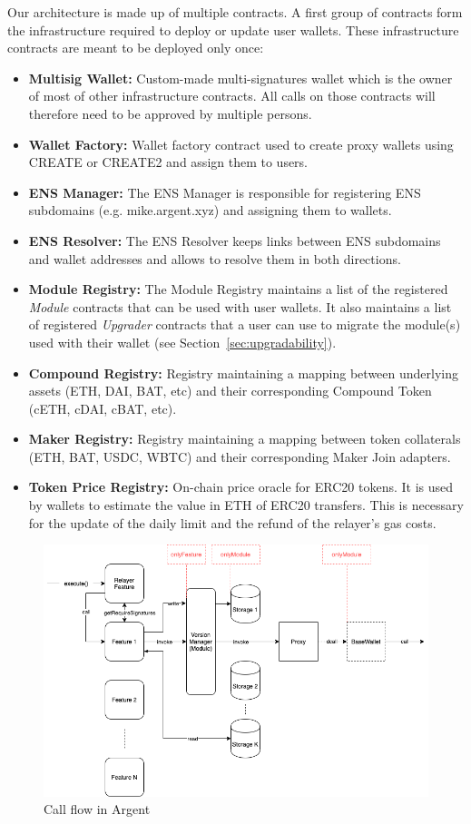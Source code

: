 \documentclass[12pt]{article}
\begin{document}
Our architecture is made up of multiple contracts. A first group of contracts form the infrastructure required to deploy or update user wallets. These infrastructure contracts are meant to be deployed only once:
\begin{itemize}
    \item \textbf{Multisig Wallet:} Custom-made multi-signatures wallet which is the owner of most of other infrastructure contracts. All calls on those contracts will therefore need to be approved by multiple persons.
    \item \textbf{Wallet Factory:} Wallet factory contract used to create proxy wallets using CREATE or CREATE2 and assign them to users.
    \item \textbf{ENS Manager:} The ENS Manager is responsible for registering ENS subdomains (e.g. mike.argent.xyz) and assigning them to wallets.
    \item \textbf{ENS Resolver:} The ENS Resolver keeps links between ENS subdomains and wallet addresses and allows to resolve them in both directions.
    \item \textbf{Module Registry:} The Module Registry maintains a list of the registered \emph{Module} contracts that can be used with user wallets. It also maintains a list of registered \emph{Upgrader} contracts that a user can use to migrate the module(s) used with their wallet (see Section~\ref{sec:upgradability}).
    \item \textbf{Compound Registry:} Registry maintaining a mapping between underlying assets (ETH, DAI, BAT, etc) and their corresponding Compound Token (cETH, cDAI, cBAT, etc).
    \item \textbf{Maker Registry:} Registry maintaining a mapping between token collaterals (ETH, BAT, USDC, WBTC) and their corresponding Maker Join adapters.
    \item \textbf{Token Price Registry:} On-chain price oracle for ERC20 tokens. It is used by wallets to estimate the value in ETH of ERC20 transfers. This is necessary for the update of the daily limit and the refund of the relayer's gas costs. 
\end{itemize}

\begin{figure}[h]
    \label{fig:sc-flow}
    \includegraphics[width=\textwidth]{SC_Flow_2_x_final_}
    \caption{Call flow in Argent}
\end{figure}
\end{document}
